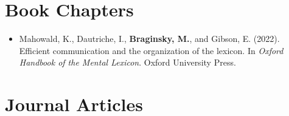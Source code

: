 \documentclass[11pt,]{article}
\providecommand{\tightlist}{%
  \setlength{\itemsep}{0pt}\setlength{\parskip}{0pt}}
\begin{document}
\section{Book Chapters}\label{book-chapters}

\begin{itemize}
\tightlist
\item
  Mahowald, K., Dautriche, I., \textbf{Braginsky, M.}, and Gibson, E.
  (2022). Efficient communication and the organization of the lexicon.
  In \emph{Oxford Handbook of the Mental Lexicon}. Oxford University
  Press.
\end{itemize}

\section{Journal Articles}\label{journal-articles}
\end{document}
